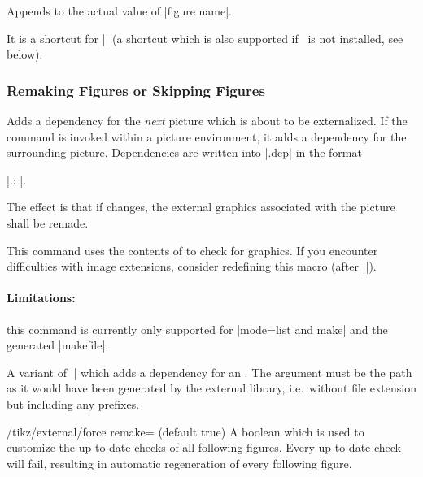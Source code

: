 {\begin{command}{\tikzappendtofigurename{}}
	Appends  to the actual value of |figure name|.

	It is a shortcut for || (a shortcut which is also supported if \tikzname\ is not installed, see below).
\end{command}


\subsubsection{Remaking Figures or Skipping Figures}
\begin{command}{\tikzpicturedependsonfile{}}
	Adds a dependency for the \emph{next} picture which is about to be externalized. If the command is invoked within a picture environment, it adds a dependency for the surrounding picture. Dependencies are written into |.dep| in the format 
	
	|.\tikzexternalimgextension: |.

	The effect is that if  changes, the external graphics associated with the picture shall be remade.

	This command uses the contents of \declareandlabel{\tikzexternalimgextension} to check for graphics. If you encounter difficulties with image extensions, consider redefining this macro (after |\tikzexternalize|).

	\paragraph{Limitations:} this command is currently only supported for |mode=list and make| and the generated |makefile|.
\end{command}
\begin{command}{\tikzexternalfiledependsonfile{}}
	A variant of |\tikzpicturedependsonfile| which adds a dependency for an . The argument  must be the path as it would have been generated by the external library, i.e.\ without file extension but including any prefixes.
\end{command}

\begin{key}{/tikz/external/force remake= (default true)}
	A boolean which is used to customize the up-to-date checks of all following figures. Every up-to-date check will fail, resulting in automatic regeneration of every following figure.


\end{key}}
